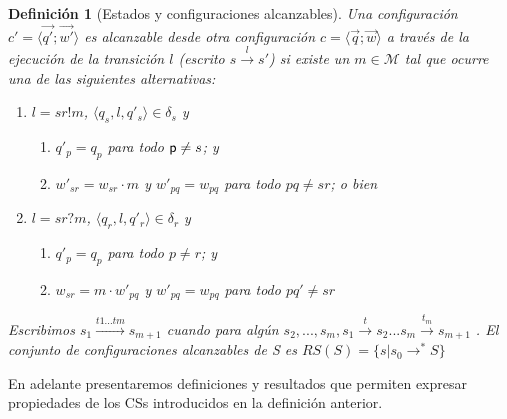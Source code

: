 \documentclass[paper=a4, fontsize=11pt, spanish]{scrartcl} %
\numberwithin{equation}{section} %
\numberwithin{figure}{section} %
\numberwithin{table}{section} %
\newtheorem{definition}{Definición}
\begin{document}
\begin{definition}[Estados y configuraciones alcanzables]
\label{def:estadosyconf}
  Una configuración $c' = \langle \overrightarrow{q'} ; \overrightarrow{w'} \rangle$ es \emph{alcanzable} desde otra
  configuración $c = \langle \overrightarrow{q} ; \overrightarrow{w} \rangle$ a través de la \emph{ejecución de la transición} $l$ (escrito $s \overset{l}{\rightarrow} s'$) si existe un $m \in \mathcal{M}$ tal que ocurre una de las siguientes alternativas:
	\begin{enumerate}
		\item $l = sr!m$, $\langle q_s, l,  q'_s\rangle \in \delta_s$ y 
			\begin{enumerate}
				\item $q'_p = q_p$ para todo $\mathsf{p} \neq s$; y
				\item $w'_{sr} = w_{sr} \cdot m$ y  $w'_{pq} = w_{pq}$ para todo $pq \neq sr$; o bien
			\end{enumerate}
		\item $l = sr?m$, $\langle q_r, l,  q'_r\rangle \in \delta_r$ y 
			\begin{enumerate}
			\item $q'_{p} = q_{p}$ para todo $p \neq r$; y
				\item $w_{sr} = m \cdot w'_{pq}$ y $w'_{pq} = w_{pq}$ para todo $pq' \neq sr$
			\end{enumerate}
	\end{enumerate}
Escribimos $ s_1 \overset{t1...tm}{\rightarrow} s_{m+1}$ cuando para algún $s_2,...,s_m, s_1\overset{t}{\rightarrow} s_2...s_m\overset{t_m}{\rightarrow} s_{m+1} $ . El conjunto de configuraciones alcanzables de S es $RS(S) = \{s | s_0 \rightarrow^*S \}$
\end{definition}

En adelante presentaremos definiciones y resultados que permiten expresar propiedades de los CSs introducidos en la definición anterior.
\end{document}
